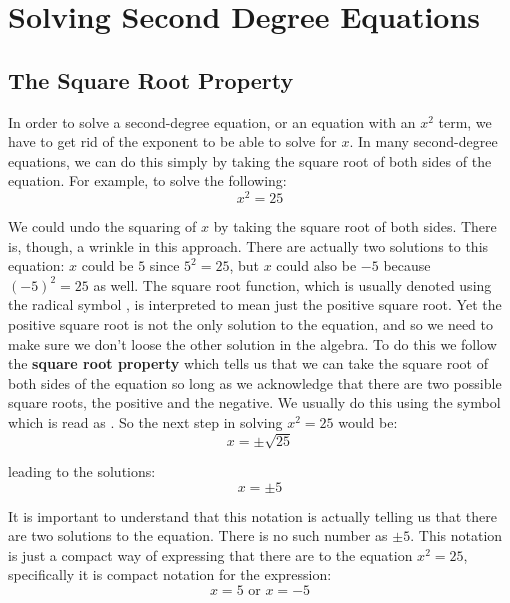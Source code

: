 %
%

\section{Solving Second Degree Equations}
\label{SolveSecondDegree}

%
%

\subsection{The Square Root Property}

In order to solve a second-degree equation, or an equation with an $x^2$ term, we have to get rid of the exponent to be able to solve for $x$. In many second-degree equations, we can do this simply by taking the square root of both sides of the equation.  For example, to solve the following:
$$x^2=25$$

We could undo the squaring of $x$ by taking the square root of both sides.  There is, though, a wrinkle in this approach.  There are actually two solutions to this equation: $x$ could be $5$ since $5^2=25$, but $x$ could also be $-5$ because $(-5)^2=25$ as well.  The square root function, which is usually denoted using the radical symbol \quotes{$\sqrt{\phantom{a}}$}, is interpreted to mean just the positive square root.  Yet the positive square root is not the only solution to the equation, and so we need to make sure we don't loose the other solution in the algebra.  To do this we follow the \textbf{square root property}  which tells us that we can take the square root of both sides of the equation so long as we acknowledge that there are two possible square roots, the positive and the negative.  We usually do this using the symbol \quotes{$\pm$} which is read as .  So the next step in solving $x^2=25$ would be:
$$x=\pm \sqrt{25}$$

leading to the solutions:
$$x=\pm 5$$

It is important to understand that this notation is actually telling us that there are two solutions to the equation.  There is no such number as $\pm 5$.  This notation is just a compact way of expressing that there are to the equation $x^2=25$, specifically it is compact notation for the expression:
$$x=5 \text{ or } x=-5$$

